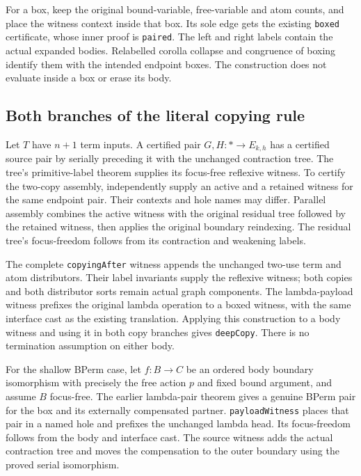 For a box, keep the original bound-variable, free-variable and atom counts,
and place the witness context inside that box. Its sole edge gets the existing
\texttt{boxed} certificate, whose inner proof is \texttt{paired}. The left
and right labels contain the actual expanded bodies. Relabelled corolla
collapse and congruence of boxing identify them with the intended endpoint
boxes. The construction does not evaluate inside a box or erase its body.


\subsection{Both branches of the literal copying rule}
Let $T$ have $n+1$ term inputs. A certified pair $G,H:*\to E_{k,h}$ has a
certified source pair by serially preceding it with the unchanged contraction
tree. The tree's primitive-label theorem supplies its focus-free reflexive
witness. To certify the two-copy assembly, independently supply an active and
a retained witness for the same endpoint pair. Their contexts and hole names
may differ. Parallel assembly combines the active witness with the original
residual tree followed by the retained witness, then applies the original
boundary reindexing. The residual tree's focus-freedom follows from its
contraction and weakening labels.


The complete \texttt{copyingAfter} witness appends the unchanged two-use term
and atom distributors. Their label invariants supply the reflexive witness;
both copies and both distributor sorts remain actual graph components.
The lambda-payload witness prefixes the original lambda operation to a boxed
witness, with the same interface cast as the existing translation. Applying
this construction to a body witness and using it in both copy branches gives
\texttt{deepCopy}. There is no termination assumption on either body.


For the shallow BPerm case, let $f:B\to C$ be an ordered body boundary
isomorphism with precisely the free action $p$ and fixed bound argument, and
assume $B$ focus-free. The earlier lambda-pair theorem gives a genuine
BPerm pair for the box and its externally compensated partner.
\texttt{payloadWitness} places that pair in a named hole and prefixes the
unchanged lambda head. Its focus-freedom follows from the body and interface
cast. The source witness adds the actual contraction tree and moves the
compensation to the outer boundary using the proved serial isomorphism.

